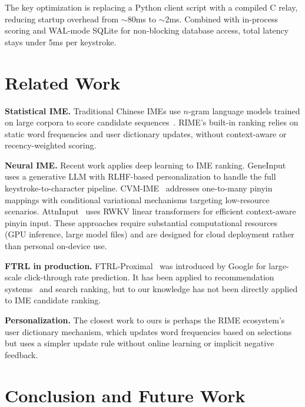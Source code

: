 \documentclass[11pt]{article}
\begin{document}
The key optimization is replacing a Python client script with a compiled C
relay, reducing startup overhead from $\sim$80ms to $\sim$2ms. Combined with
in-process scoring and WAL-mode SQLite for non-blocking database access, total
latency stays under 5ms per keystroke.

\section{Related Work}

\textbf{Statistical IME.} Traditional Chinese IMEs use $n$-gram language models
trained on large corpora to score candidate sequences~\cite{ngram_ime}. RIME's
built-in ranking relies on static word frequencies and user dictionary updates,
without context-aware or recency-weighted scoring.

\textbf{Neural IME.} Recent work applies deep learning to IME ranking.
GeneInput~\cite{geneinput} uses a generative LLM with RLHF-based personalization
to handle the full keystroke-to-character pipeline. CVM-IME~\cite{cvm_ime}
addresses one-to-many pinyin mappings with conditional variational mechanisms
targeting low-resource scenarios. AttnInput~\cite{attninput} uses RWKV linear
transformers for efficient context-aware pinyin input. These approaches require
substantial computational resources (GPU inference, large model files) and are
designed for cloud deployment rather than personal on-device use.

\textbf{FTRL in production.} FTRL-Proximal~\cite{ftrl} was introduced by Google
for large-scale click-through rate prediction. It has been applied to
recommendation systems~\cite{form_ftrl} and search ranking, but to our
knowledge has not been directly applied to IME candidate ranking.

\textbf{Personalization.} The closest work to ours is perhaps the RIME
ecosystem's user dictionary mechanism, which updates word frequencies based on
selections but uses a simpler update rule without online learning or implicit
negative feedback.

\section{Conclusion and Future Work}
\end{document}
